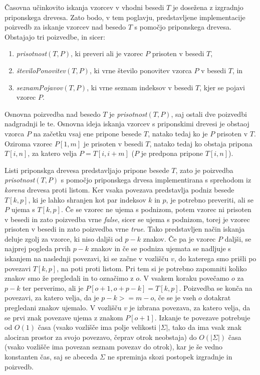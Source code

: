 Časovna učinkovito iskanja vzorcev v vhodni besedi $T$ je dosežena z izgradnjo priponskega drevesa. Zato bodo, v tem poglavju, predstavljene implementacije poizvedb za iskanje vzorcev nad besedo $T$ s pomočjo priponskega drevesa. Obstajajo tri poizvedbe, in sicer:
\begin{enumerate}
    \item \textit{prisotnost}$(T,P)$, ki preveri ali je vzorec $P$ prisoten v besedi $T$,
    \item \textit{številoPonovitev}$(T,P)$, ki vrne število ponovitev vzorca $P$ v besedi $T$, in
    \item \textit{seznamPojavov}$(T,P)$, ki vrne seznam indeksov v besedi $T$, kjer se pojavi vzorec $P$.
\end{enumerate}

Osnovna poizvedba nad besedo $T$ je \textit{prisotnost}$(T,P)$, saj ostali dve poizvedbi nadgradnji le te. Osnovna ideja iskanja vzorcev s priponskimi drevesi je obstaoj vzorca $P$ na začetku vsaj ene pripone besede $T$, natako tedaj ko je $P$ prisoten v $T$. Oziroma vzorec $P[1,m]$ je prisoten v besedi $T$, natako tedaj ko obstaja pripona $T[i,n]$, za katero velja $P=T[i,i+m]$ ($P$ je predpona pripone $T[i,n]$). 

Listi priponskga drevesa predstavljajo pripone besede $T$, zato je poizvedba \textit{prisotnost}$(T,P)$ s pomočjo priponskega drvesa implementirana s sprehodom iz \textit{korena} drevesa proti listom. Ker vsaka povezava predstavlja podniz besede $T[k,p]$, ki je lahko shranjen kot par indeksov $k$ in $p$, je potrebno preveriti, ali se $P$ ujema s $T[k,p]$. Če se vzorec ne ujema s podnizom, potem vzorec ni prisoten v besedi in zato poizvedba vrne \textit{false}, sicer se ujema s podnizom, torej je vzorec prisoten v besedi in zato poizvedba vrne \textit{true}. Tako predstavljen način iskanja deluje zgolj za vzorce, ki niso daljši od $p-k$ znakov. Če pa je vzorec $P$ daljši, se najprej pogleda prvih $p-k$ znakov in če se podniza ujemata se nadljuje s iskanjem na naslednji povezavi, ki se začne v vozlišču $v$, do katerega smo prišli po povezavi $T[k,p]$, na poti proti listom. Pri tem si je potrebno zapomniti koliko znakov smo že pregledali in to označimo z $o$. V vsakem koraku povečamo $o$ za $p-k$ ter perverimo, ali je $P[o+1,o+p-k]=T[k,p]$. Poizvedba se konča na povezavi, za katero velja, da je $p-k>=m-o$, če se je vseh $o$ dotakrat pregledani znakov ujemalo. V vozlišču $v$ je izbrana povezava, za katero velja, da se prvi znak povezave ujema z znakom $P[o+1]$. Izkanje te povezave potrebuje od $O(1)$ časa (vsako vozlišče ima polje velikosti $|\Sigma|$, tako da ima vsak znak alociran prostor za svojo povezavo, čeprav otrok neobstaja) do $O(|\Sigma|)$ časa (vsako vozlišče ima povezan seznam povezav do otrok), kar je še vedno konstanten čas, saj se abeceda $\Sigma$ ne spreminja skozi postopek izgradnje in poizvedb.

